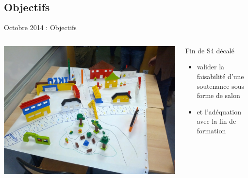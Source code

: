 \documentclass{beamer}
\begin{document}
\subsection{Objectifs}
\begin{frame}{Octobre 2014 : Objectifs}
  \begin{columns}
    \begin{column}{0.5\textwidth}
      \begin{center}
        \includegraphics[width=\textwidth]{includes/201410_lego.jpg}      
      \end{center}
    \end{column}
    \begin{column}{0.5\textwidth}
      Fin de S4 décalé
      \begin{itemize}
        \item valider la faisabilité d'une soutenance sous forme de salon 
        \item et l'adéquation avec la fin de formation
      \end{itemize}
    \end{column}
  \end{columns}
\end{frame}
\end{document}
